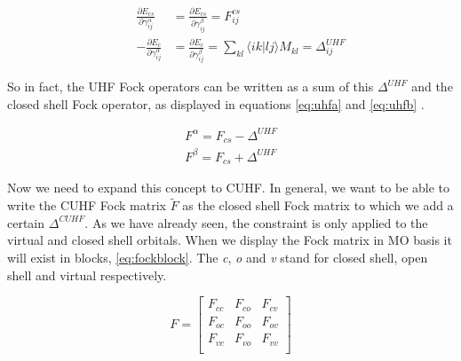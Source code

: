 \documentclass[twoside,twocolumn,9pt]{article}
\begin{document}
\begin{subequations}
  \begin{align}
    \label{eq:der1}
     &  & \frac{\partial E_{cs}}{\partial \gamma^\alpha_{ij}} & = \frac{\partial E_{cs}}{\partial \gamma^\beta_{ij}} = F^{cs}_{ij}                                             \\
    \label{eq:der2}
     &  & -\frac{\partial E_c}{\partial \gamma^\alpha_{ij}}   & = \frac{\partial E_c}{\partial \gamma^\beta_{ij}} = \sum_{kl} \langle ik|lj \rangle M_{kl} = \Delta^{UHF}_{ij}
  \end{align}
\end{subequations}

So in fact, the UHF Fock operators can be written as a sum of this $\Delta^{UHF}$ and the closed shell Fock operator, as displayed in equations \eqref{eq:uhfa} and \eqref{eq:uhfb}
\cite{Scuseria2010}. 

\begin{subequations}
  \begin{align}
    \label{eq:uhfa}
    F^\alpha = F_{cs} - \Delta^{UHF} \\
    \label{eq:uhfb}
    F^\beta = F_{cs} + \Delta^{UHF}
  \end{align}
\end{subequations}

Now we need to expand this concept to CUHF. In general, we want
to be able to write the CUHF Fock matrix $\tilde{F}$ as the closed shell Fock matrix to which we add a certain $\Delta^{CUHF}$. As we have already seen, the constraint is only
applied to the virtual and closed shell orbitals. When we display the Fock matrix in MO basis it will exist in blocks, \eqref{eq:fockblock}. The \textit{c}, \textit{o} and \textit{v}
stand for closed shell, open shell and virtual respectively.

\begin{equation}\label{eq:fockblock}
  F = \begin{bmatrix}
    F_{cc} & F_{co} & F_{cv} \\
    F_{oc} & F_{oo} & F_{ov} \\
    F_{vc} & F_{vo} & F_{vv} \\
  \end{bmatrix}
\end{equation}
\end{document}
